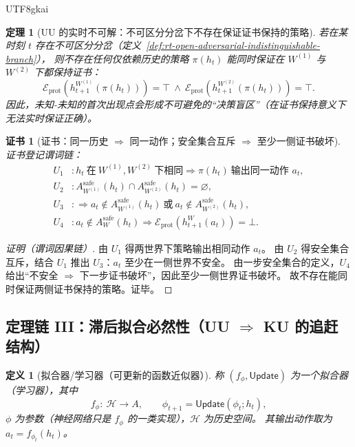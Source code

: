 \documentclass[12pt]{article}
\newtheorem{definition}{定义}[section]
\newtheorem{theorem}{定理}[section]
\newtheorem{Certificate}{证书}[section]
\begin{document}
\begin{CJK*}{UTF8}{gkai}
\begin{theorem}[UU 的实时不可解：不可区分分岔下不存在保证证书保持的策略]
\label{thm:rt-open-adversarial-uu-impossible}
若在某时刻 $t$ 存在不可区分分岔（定义~\ref{def:rt-open-adversarial-indistinguishable-branch}），
则不存在任何仅依赖历史的策略 $\pi(h_t)$ 能同时保证在 $W^{(1)}$ 与 $W^{(2)}$ 下都保持证书：
\[
  \mathcal{E}_{\mathrm{prot}}(h_{t+1}^{W^{(1)}}(\pi(h_t)))=\top
  \ \wedge\
  \mathcal{E}_{\mathrm{prot}}(h_{t+1}^{W^{(2)}}(\pi(h_t)))=\top.
\]
因此，未知-未知的首次出现点会形成不可避免的“决策盲区”（在证书保持意义下无法实时保证正确）。
\end{theorem}

\begin{Certificate}[证书：同一历史 $\Rightarrow$ 同一动作；安全集合互斥 $\Rightarrow$ 至少一侧证书破坏]
\label{cert:rt-open-adversarial-uu-impossible}
证书登记谓词链：
\[
\begin{aligned}
  U_1 &: h_t\ \text{在}\ W^{(1)},W^{(2)}\ \text{下相同}\Rightarrow \pi(h_t)\ \text{输出同一动作 }a_t,\\
  U_2 &: A^{\mathrm{safe}}_{W^{(1)}}(h_t)\cap A^{\mathrm{safe}}_{W^{(2)}}(h_t)=\varnothing,\\
  U_3 &: \Rightarrow a_t\notin A^{\mathrm{safe}}_{W^{(1)}}(h_t)\ \text{或}\ a_t\notin A^{\mathrm{safe}}_{W^{(2)}}(h_t),\\
  U_4 &: a_t\notin A^{\mathrm{safe}}_{W}(h_t)\Rightarrow \mathcal{E}_{\mathrm{prot}}(h_{t+1}^{W}(a_t))=\bot.
\end{aligned}
\]
\end{Certificate}

\begin{proof}[证明（谓词因果链）]
由 $U_1$ 得两世界下策略输出相同动作 $a_t$。
由 $U_2$ 得安全集合互斥，结合 $U_1$ 推出 $U_3$：$a_t$ 至少在一侧世界不安全。
由一步安全集合的定义，$U_4$ 给出“不安全 $\Rightarrow$ 下一步证书破坏”，因此至少一侧世界证书破坏。
故不存在能同时保证两侧证书保持的策略。证毕。
\end{proof}

\subsection{定理链 III：滞后拟合必然性（UU $\Rightarrow$ KU 的追赶结构）}
\label{sec:rt-open-adversarial-lag-fitting}

\begin{definition}[拟合器/学习器（可更新的函数近似器）]
\label{def:rt-open-adversarial-learner}
称 $(f_\phi,\mathsf{Update})$ 为一个拟合器（学习器），其中
\[
  f_\phi:\ \mathcal{H}\to A,\qquad \phi_{t+1}=\mathsf{Update}(\phi_t;h_t),
\]
$\phi$ 为参数（神经网络只是 $f_\phi$ 的一类实现），$\mathcal{H}$ 为历史空间。
其输出动作取为 $a_t=f_{\phi_t}(h_t)$。
\end{definition}


\end{CJK*}
\end{document}
